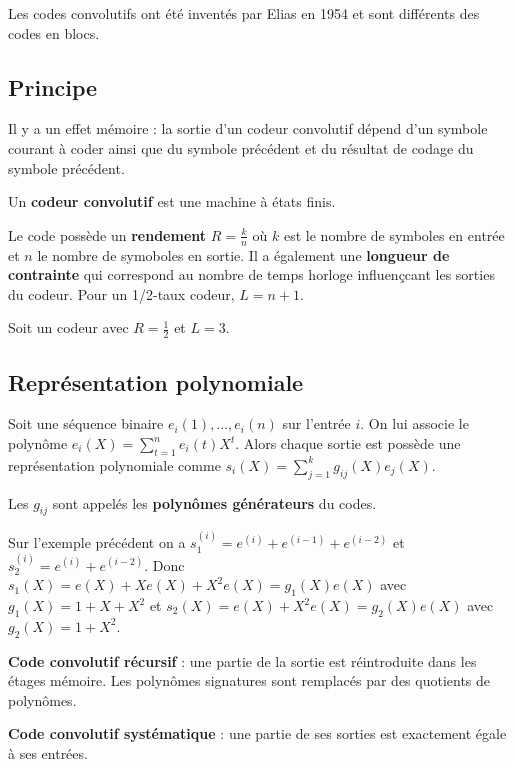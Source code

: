 Les codes convolutifs ont été inventés par Elias en 1954 et sont différents des codes en blocs.

\subsection{Principe}

	Il y a un effet mémoire : la sortie d’un codeur convolutif dépend d’un symbole courant à coder ainsi que du symbole précédent et du résultat de codage du symbole précédent.

	Un \textbf{codeur convolutif} est une machine à états finis.

	Le code possède un \textbf{rendement} $R = \frac{k}{n}$ où $k$ est le nombre de symboles en entrée et $n$ le nombre de symoboles en sortie.
	Il a également une \textbf{longueur de contrainte} qui correspond au nombre de temps horloge influençcant les sorties du codeur.
	Pour un 1/2-taux codeur, $L = n + 1$.

	\begin{ex}
		Soit un codeur avec $R = \frac{1}{2}$ et $L = 3$.
	\end{ex}

\subsection{Représentation polynomiale}

	Soit une séquence binaire $e_i(1),\ldots,e_i(n)$ sur l'entrée $i$.
	On lui associe le polynôme $e_i(X) = \sum_{t = 1}^n e_i(t) X^t$.
	Alors chaque sortie est possède une représentation polynomiale comme $s_i(X) = \sum_{j = 1}^k g_{ij}(X) e_j(X)$.
	
	Les $g_{ij}$ sont appelés les \textbf{polynômes générateurs} du codes.

	\begin{ex}
		Sur l'exemple précédent on a $s_1^{(i)} = e^{(i)} + e^{(i - 1)} + e^{(i - 2)}$ et $s_2^{(i)} = e^{(i)} + e^{(i - 2)}$.
		Donc $s_1(X) = e(X) + X e(X) + X^2 e(X) = g_1(X) e(X)$ avec $g_1(X) = 1 + X + X^2$ et $s_2(X) = e(X) + X^2 e(X) = g_2(X) e(X)$ avec $g_2(X) = 1 + X^2$.
	\end{ex}

	\begin{defn}
		\textbf{Code convolutif récursif} : une partie de la sortie est réintroduite dans les étages mémoire.
		Les polynômes signatures sont remplacés par des quotients de polynômes.
	\end{defn}
	
	\begin{defn}
		\textbf{Code convolutif systématique} : une partie de ses sorties est exactement égale à ses entrées.
	\end{defn}
